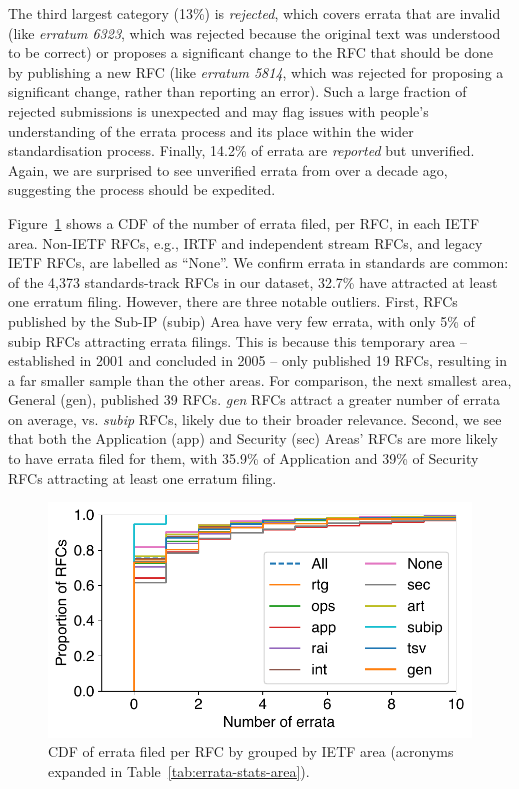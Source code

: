 \documentclass[twocolumn,10pt]{article}
\newlength{\figureWidthOneColumn}
\newcommand{\pb}[1]{\vspace{0.75ex}\noindent{\textbf{#1}}}
\begin{document}
The third largest category (13\%) is \emph{rejected}, which covers errata
that are invalid (like \emph{erratum 6323}, which was rejected because the
original text was understood to be correct) or proposes a significant
change to the RFC that should be done by publishing a new RFC (like
\emph{erratum 5814}, which was rejected for proposing a significant change,
rather than reporting an error). Such a large fraction of rejected
submissions is unexpected and may flag issues with people's understanding
of the errata process and its place within the wider standardisation
process.  Finally, 14.2\% of errata are \emph{reported} but unverified.
Again, we are surprised to see unverified errata from over a decade ago,
suggesting the process should be expedited. 


\pb{Errata per RFC Area, Status, and Stream:}
Figure~\ref{fig:errata_per_rfc} shows a CDF of the number of errata filed,
per RFC, in each IETF area. Non-IETF RFCs, e.g., IRTF and independent stream
RFCs, and legacy IETF RFCs, are labelled as ``None''.  We confirm errata in
standards are common: of the 4,373 standards-track RFCs in our dataset,
32.7\% have attracted at least one erratum filing.  However, there are
three notable outliers.  First, RFCs published by the Sub-IP (subip) Area
have very few errata, with only 5\% of subip RFCs attracting errata
filings. This is because this temporary area -- established in 2001 and
concluded in 2005 -- only published 19 RFCs, resulting in a far smaller
sample than the other areas. For comparison, the next smallest area,
General (gen), published 39 RFCs. \emph{gen} RFCs attract a greater number
of errata on average, vs. \emph{subip} RFCs, likely due to their broader
relevance.  Second, we see that both the Application (app) and Security
(sec) Areas' RFCs are more likely to have errata filed for them, with
35.9\% of Application and 39\% of Security RFCs attracting at least one
erratum filing.

\begin{figure}
  \centering
  \includegraphics[width=\figureWidthOneColumn]{figures-prev/tma-2023/errata-by-rfc-by-area.pdf}
  \caption{
    CDF of errata filed per RFC by grouped by IETF area (acronyms expanded
    in Table~\ref{tab:errata-stats-area}).
  }
  \label{fig:errata_per_rfc}
\end{figure}
\end{document}
